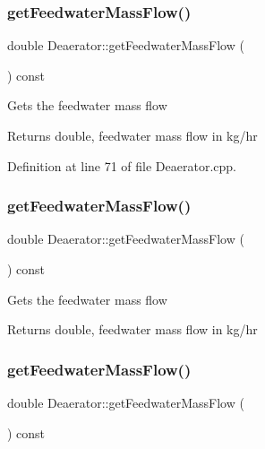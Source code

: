 \subsubsection{\texorpdfstring{get\+Feedwater\+Mass\+Flow()}{getFeedwaterMassFlow()}\hspace{0.1cm}{\footnotesize\ttfamily [1/3]}}
{\footnotesize\ttfamily double Deaerator\+::get\+Feedwater\+Mass\+Flow (\begin{DoxyParamCaption}{ }\end{DoxyParamCaption}) const}

Gets the feedwater mass flow \begin{DoxyReturn}{Returns}
double, feedwater mass flow in kg/hr 
\end{DoxyReturn}


Definition at line 71 of file Deaerator.\+cpp.

\mbox{\label{class_deaerator_ae1524e8b406c3d5c2823ae4e6bafe389}} 
\subsubsection{\texorpdfstring{get\+Feedwater\+Mass\+Flow()}{getFeedwaterMassFlow()}\hspace{0.1cm}{\footnotesize\ttfamily [2/3]}}
{\footnotesize\ttfamily double Deaerator\+::get\+Feedwater\+Mass\+Flow (\begin{DoxyParamCaption}{ }\end{DoxyParamCaption}) const}

Gets the feedwater mass flow \begin{DoxyReturn}{Returns}
double, feedwater mass flow in kg/hr 
\end{DoxyReturn}
\mbox{\label{class_deaerator_ae1524e8b406c3d5c2823ae4e6bafe389}} 
\subsubsection{\texorpdfstring{get\+Feedwater\+Mass\+Flow()}{getFeedwaterMassFlow()}\hspace{0.1cm}{\footnotesize\ttfamily [3/3]}}
{\footnotesize\ttfamily double Deaerator\+::get\+Feedwater\+Mass\+Flow (\begin{DoxyParamCaption}{ }\end{DoxyParamCaption}) const}

